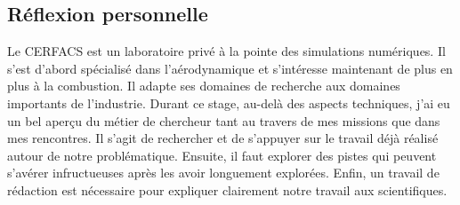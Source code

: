 \subsection*{Réflexion personnelle}

Le CERFACS est un laboratoire privé à la pointe des simulations numériques. Il s'est d'abord spécialisé dans l'aérodynamique et s’intéresse maintenant de plus en plus à la combustion. Il adapte ses domaines de recherche aux domaines importants de l'industrie.
Durant ce stage, au-delà des aspects techniques, j'ai eu un bel aperçu du métier de chercheur tant au travers de mes missions que dans mes rencontres. Il s'agit de rechercher et de s'appuyer sur le travail déjà réalisé autour de notre problématique.
Ensuite, il faut explorer des pistes qui peuvent s'avérer infructueuses après les avoir longuement explorées.
Enfin, un travail de rédaction est nécessaire pour expliquer clairement notre travail aux scientifiques.